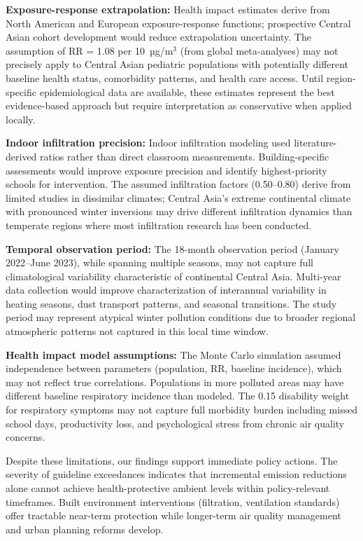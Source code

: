 \documentclass[11pt,a4paper]{article}
\begin{document}
\textbf{Exposure-response extrapolation:} Health impact estimates derive from North American and European exposure-response functions; prospective Central Asian cohort development would reduce extrapolation uncertainty. The assumption of RR = 1.08 per 10~µg/m$^3$ (from global meta-analyses) may not precisely apply to Central Asian pediatric populations with potentially different baseline health status, comorbidity patterns, and health care access. Until region-specific epidemiological data are available, these estimates represent the best evidence-based approach but require interpretation as conservative when applied locally.

\textbf{Indoor infiltration precision:} Indoor infiltration modeling used literature-derived ratios rather than direct classroom measurements. Building-specific assessments would improve exposure precision and identify highest-priority schools for intervention. The assumed infiltration factors (0.50--0.80) derive from limited studies in dissimilar climates; Central Asia's extreme continental climate with pronounced winter inversions may drive different infiltration dynamics than temperate regions where most infiltration research has been conducted.

\textbf{Temporal observation period:} The 18-month observation period (January 2022--June 2023), while spanning multiple seasons, may not capture full climatological variability characteristic of continental Central Asia. Multi-year data collection would improve characterization of interannual variability in heating seasons, dust transport patterns, and seasonal transitions. The study period may represent atypical winter pollution conditions due to broader regional atmospheric patterns not captured in this local time window.

\textbf{Health impact model assumptions:} The Monte Carlo simulation assumed independence between parameters (population, RR, baseline incidence), which may not reflect true correlations. Populations in more polluted areas may have different baseline respiratory incidence than modeled. The 0.15 disability weight for respiratory symptoms may not capture full morbidity burden including missed school days, productivity loss, and psychological stress from chronic air quality concerns.

Despite these limitations, our findings support immediate policy actions. The severity of guideline exceedances indicates that incremental emission reductions alone cannot achieve health-protective ambient levels within policy-relevant timeframes. Built environment interventions (filtration, ventilation standards) offer tractable near-term protection while longer-term air quality management and urban planning reforms develop.
\end{document}
